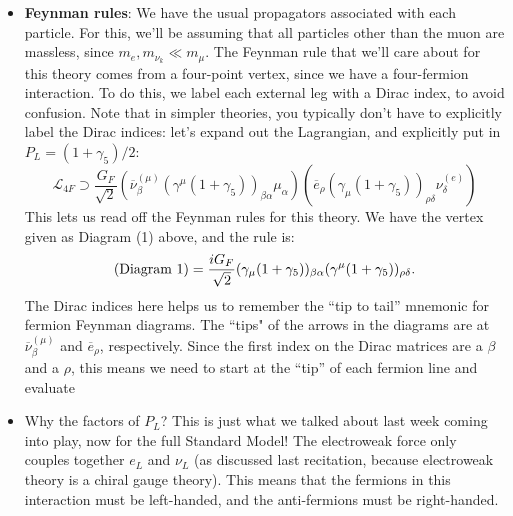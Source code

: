 \documentclass[12pt, oneside]{article}   	%
\theoremstyle{definition}
\begin{document}
\begin{itemize}
	\item \textbf{Feynman rules}: We have the usual propagators associated with each particle. For this, we'll be assuming that all particles other than the muon are massless, since $m_e, m_{\nu_k}\ll m_\mu$. The Feynman rule that we'll care about for this theory comes from a four-point vertex, since we have a four-fermion interaction. To do this, we label each external leg with a Dirac index, to avoid confusion. Note that in simpler theories, you typically don't have to explicitly label the Dirac indices: let's expand out the Lagrangian, and explicitly put in $P_L = (1 + \gamma_5) / 2$:
	\begin{equation}
		\mathcal L_{4F} \supset \frac{G_F}{\sqrt 2} \left(\overline \nu^{(\mu)}_\beta (\gamma^\mu (1 + \gamma_5))_{\beta\alpha} \mu_\alpha \right) 
		\left( \overline e_\rho (\gamma_\mu (1 + \gamma_5))_{\rho\delta} \nu^{(e)}_\delta \right)
	\end{equation}
	This lets us read off the Feynman rules for this theory. We have the vertex given as Diagram (1) above, and the rule is:
	\begin{equation}
		(\textnormal{Diagram 1}) = \frac{i G_F}{\sqrt 2} (\gamma_\mu (1 + \gamma_5))_{\beta\alpha} (\gamma^\mu (1 + \gamma_5))_{\rho\delta}. 
	\end{equation}
	The Dirac indices here helps us to remember the ``tip to tail'' mnemonic for fermion Feynman diagrams. The ``tips" of the arrows in the diagrams are at $\overline\nu_\beta^{(\mu)}$ and $\overline e_\rho$, respectively. Since the first index on the Dirac matrices are a $\beta$ and a $\rho$, this means we need to start at the ``tip'' of each fermion line and evaluate

	\item Why the factors of $P_L$? This is just what we talked about last week coming into play, now for the full Standard Model! The electroweak force only couples together $e_L$ and $\nu_L$ (as discussed last recitation, because electroweak theory is a chiral gauge theory). This means that the fermions in this interaction must be left-handed, and the anti-fermions must be right-handed. 


\end{itemize}
\end{document}
